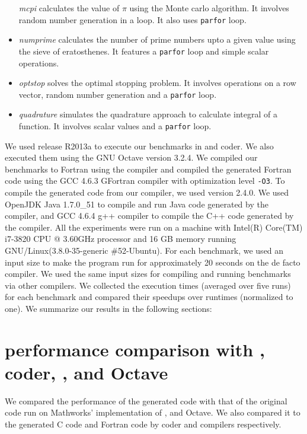\begin{itemize}
\emph{mcpi} calculates the value of $\pi$ using the Monte carlo algorithm.  It
involves random number generation in a loop. It also uses \texttt{parfor} loop.
\item \emph{numprime} calculates the number of prime numbers upto a given value
using the sieve of eratosthenes. It features a \texttt{parfor} loop and simple
scalar operations.  \item \emph{optstop} solves the optimal stopping problem. It
involves operations on a row vector, random number generation and a
\texttt{parfor} loop.  \item \emph{quadrature} simulates the quadrature approach
to calculate integral of a function. It involves scalar values and a
\texttt{parfor} loop.  \end{itemize}

We used \matlab release R2013a to execute our benchmarks in \matlab and \matlab
coder. We also executed them using the GNU Octave version 3.2.4. We compiled our
benchmarks to Fortran using the \mctwofor compiler and compiled the generated
Fortran code using the GCC 4.6.3 GFortran compiler with optimization level
\texttt{-O3}. To compile the generated \xten code from our \mixten compiler, we
used \xten version 2.4.0. We used OpenJDK Java 1.7.0\_51 to compile and run Java
code generated by the \xten compiler, and GCC 4.6.4 g++ compiler to compile the
C++ code generated by the \xten compiler. All the experiments were run on a
machine with Intel(R) Core(TM) i7-3820 CPU @ 3.60GHz processor and 16 GB memory
running GNU/Linux(3.8.0-35-generic \#52-Ubuntu). For each benchmark, we used an
input size to make the program run for approximately 20 seconds on the de facto
\matlab compiler. We used the same input sizes for compiling and running
benchmarks via other compilers. We collected the execution times (averaged over
five runs) for each benchmark and compared their speedups over \matlab runtimes
(normalized to one). We summarize our results in the following sections:


\section{\mixten performance comparison with \matlab, \matlab coder, \mctwofor,
and Octave}

We compared the performance of the generated \xten code with that of the
original \matlab code run on Mathworks' implementation of \matlab, and Octave.
We also compared it to the generated C code and Fortran code by \matlab coder
and \mctwofor compilers respectively. 

